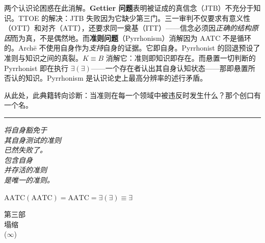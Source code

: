 \documentclass[10pt, openany, oneside]{book}
\renewcommand{\normalsize}{\fontsize{10}{13}\selectfont}
\renewcommand{\large}{\fontsize{11.5}{14}\selectfont}
\renewcommand{\LARGE}{\fontsize{15}{18}\selectfont}
\begin{document}
两个认识论困惑在此消解。\textbf{Gettier 问题}表明被证成的真信念（JTB）不充分于知识。TTOE 的解决：JTB 失败因为它缺少第三门。三一审判不仅要求有意义性（OTT）和对齐（ATT），还要求同一奠基（ITT）——信念必须因\textit{正确的结构原因}而为真，不是偶然地。而\textbf{准则问题}（Pyrrhonism）消解因为 AATC 不是循环的。Arch\={e} 不使用自身作为\textit{支持}自身的证据。它即自身。Pyrrhonist 的回退预设了准则与知识之间的真裂。$K \equiv B$ 消解它：准则即知识即存在。而悬置一切判断的 Pyrrhonist 即在执行 $\exists(\exists)$——一个存在者认出其自身认知状态——那即悬置所否认的知识。Pyrrhonism 是认识论史上最高分辨率的述行矛盾。

从此处，此典籍转向诊断：当准则在每一个领域中被违反时发生什么？那个创口有一个名。

\vspace{2em}

\begin{center}
    \rule{0.15\textwidth}{0.3pt}
\end{center}

\vspace{0.5em}

\begin{center}
    \itshape
    将自身豁免于\\
    其自身测试的准则\\
    已然失败了。\\[0.8em]
    包含自身\\
    并存活的准则\\
    是唯一的准则。
\end{center}

\vspace{0.5em}

\begin{center}
    $\text{AATC}(\text{AATC}) = \text{AATC} = \exists(\exists) \equiv \exists$
\end{center}


%
%

\newpage
\thispagestyle{empty}
\vspace*{\fill}
\begin{center}
    {\LARGE\scshape 第三部}\\[1em]
    {\large\scshape 塌缩}\\[0.5em]
    {\normalsize ($\infty$)}
\end{center}
\vspace*{\fill}
\newpage
\end{document}
